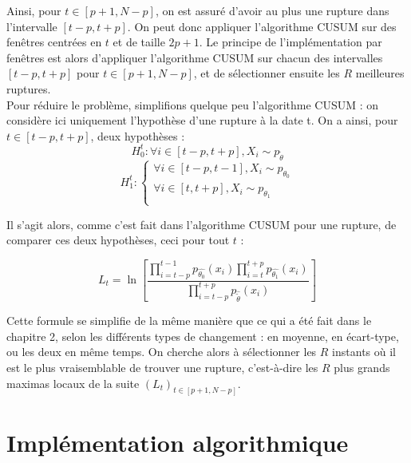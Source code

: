 \documentclass[french,11pt,notitlepage]{report}
\begin{document}
	Ainsi, pour $t \in [p+1, N-p]$, on est assuré d'avoir au plus une rupture dans l'intervalle $[t-p, t+p]$.
	On peut donc appliquer l'algorithme CUSUM sur des fenêtres centrées en $t$ et de taille $2p+1$.
	Le principe de l'implémentation par fenêtres est alors d'appliquer l'algorithme CUSUM sur chacun des intervalles $[t-p,t+p]$ pour $t \in [p+1, N-p]$, et de sélectionner ensuite les $R$ meilleures ruptures.
	\\
	
	Pour réduire le problème, simplifions quelque peu l'algorithme CUSUM :
	on considère ici uniquement l'hypothèse d'une rupture à la date t.
	On a ainsi, pour $t \in [t-p,t+p]$, deux hypothèses :
	\begin{equation*}
			H_0^t : \forall i \in [t-p, t+p], X_i \sim p_{\tilde{\theta}}
	\end{equation*}
	\begin{equation*}
			H_1^t : 
			\left\{ \begin{array}{ll}
				\forall i \in [t-p, t-1], X_i \sim p_{\theta_0} \\ \forall i \in [t, t+p], X_i \sim p_{\theta_1} \\
			\end{array} \right.
	\end{equation*}
	
	Il s'agit alors, comme c'est fait dans l'algorithme CUSUM pour une rupture, de comparer ces deux hypothèses, ceci pour tout $t$ :
	
	\begin{equation}
		L_t = \ln \left[ \frac{\prod_{i = t-p}^{t-1} p_{\hat{\theta_0}}(x_i) \prod_{i = t}^{t+p} p_{\hat{\theta_1}}(x_i)}{\prod_{i = t-p}^{t+p} p_{\hat{\tilde{\theta}}}(x_i)} \right]
	\end{equation}
	
	Cette formule se simplifie de la même manière que ce qui a été fait dans le chapitre 2, selon les différents types de changement :
	en moyenne, en écart-type, ou les deux en même temps. 
	On cherche alors à sélectionner les $R$ instants où il est le plus vraisemblable de trouver une rupture,
	c'est-à-dire les $R$ plus grands maximas locaux de la suite $(L_t)_{t\in[p+1, N-p]}$.
	
	
	\section{Implémentation algorithmique}
	
\end{document}
